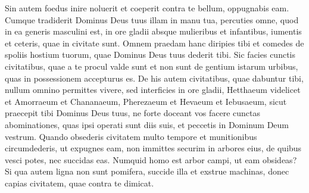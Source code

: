 \begin{biblechapter}
\begin{biblechapter}
\begin{biblechapter}
\begin{biblechapter}
\begin{biblechapter}
\begin{biblechapter}
\begin{biblechapter}
\begin{biblechapter}
\begin{biblechapter}
\begin{biblechapter}
\begin{biblechapter}
\begin{biblechapter}
\begin{biblechapter}
\begin{biblechapter}
\begin{biblechapter}
\begin{biblechapter}
\begin{biblechapter}
\begin{biblechapter}
\begin{biblechapter}
\begin{biblechapter}
\verse Sin autem foedus inire noluerit et coeperit contra te bellum, oppugnabis eam. 
\verse Cumque tradiderit Dominus Deus tuus illam in manu tua, percuties omne, quod in ea generis masculini est, in ore gladii 
\verse absque mulieribus et infantibus, iumentis et ceteris, quae in civitate sunt. Omnem praedam hanc diripies tibi et comedes de spoliis hostium tuorum, quae Dominus Deus tuus dederit tibi.
 \verse Sic facies cunctis civitatibus, quae a te procul valde sunt et non sunt de gentium istarum urbibus, quas in possessionem accepturus es. 
\verse De his autem civitatibus, quae dabuntur tibi, nullum omnino permittes vivere, 
\verse sed interficies in ore gladii, Hetthaeum videlicet et Amorraeum et Chananaeum, Pherezaeum et Hevaeum et Iebusaeum, sicut praecepit tibi Dominus Deus tuus, 
 \verse ne forte doceant vos facere cunctas abominationes, quas ipsi operati sunt diis suis, et peccetis in Dominum Deum vestrum.
 \verse Quando obsederis civitatem multo tempore et munitionibus circumdederis, ut expugnes eam, non immittes securim in arbores eius, de quibus vesci potes, nec succidas eas. Numquid homo est arbor campi, ut eam obsideas? 
\verse Si qua autem ligna non sunt pomifera, succide illa et exstrue machinas, donec capias civitatem, quae contra te dimicat.
 

\end{biblechapter}
\end{biblechapter}
\end{biblechapter}
\end{biblechapter}
\end{biblechapter}
\end{biblechapter}
\end{biblechapter}
\end{biblechapter}
\end{biblechapter}
\end{biblechapter}
\end{biblechapter}
\end{biblechapter}
\end{biblechapter}
\end{biblechapter}
\end{biblechapter}
\end{biblechapter}
\end{biblechapter}
\end{biblechapter}
\end{biblechapter}
\end{biblechapter}
